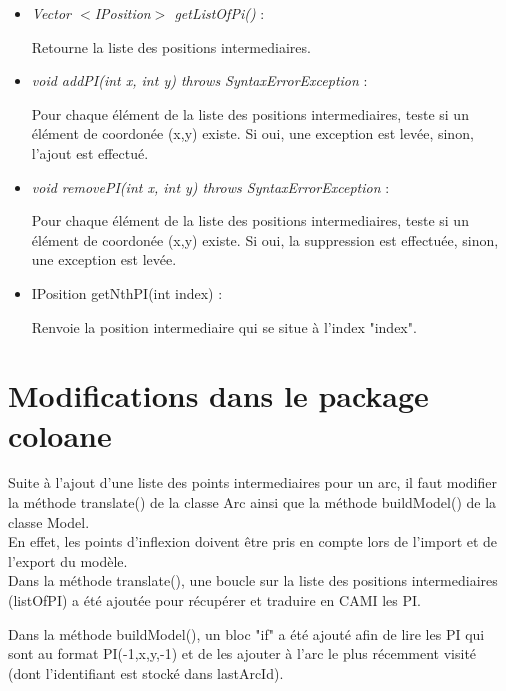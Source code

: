 \documentclass{article}
\begin{document}
\begin{itemize}
\item \textit{Vector $<$IPosition$>$ getListOfPi()} :

Retourne la liste des positions intermediaires.\\

\item \textit{void addPI(int x, int y) throws SyntaxErrorException} :

Pour chaque \'el\'ement de la liste des positions intermediaires, teste si un \'el\'ement de coordon\'ee (x,y) existe.
Si oui, une exception est lev\'ee, sinon, l'ajout est effectu\'e.\\

\item  \textit{void removePI(int x, int y) throws SyntaxErrorException} :

Pour chaque \'el\'ement de la liste des positions intermediaires, teste si un \'el\'ement de coordon\'ee (x,y) existe.
Si oui, la suppression est effectu\'ee, sinon, une exception est lev\'ee.\\

\item IPosition getNthPI(int index) :

Renvoie la position intermediaire qui se situe \`a l'index "index".\\
\end{itemize}


\section{Modifications dans le package coloane}

Suite \`a l'ajout d'une liste des points intermediaires pour un arc, il faut modifier la m\'ethode translate() de la classe Arc ainsi que la m\'ethode buildModel() de la classe Model.\\

En effet, les points d'inflexion doivent \^etre pris en compte lors de l'import et de l'export du mod\`ele.\\

Dans la m\'ethode translate(), une boucle sur la liste des positions intermediaires (listOfPI) a \'et\'e ajout\'ee pour r\'ecup\'erer et traduire en CAMI les PI.

Dans la m\'ethode buildModel(), un bloc "if" a \'et\'e ajout\'e afin de lire les PI qui sont au format PI(-1,x,y,-1) et de les ajouter \`a l'arc le plus r\'ecemment visit\'e (dont l'identifiant est stock\'e dans lastArcId).
\end{document}
